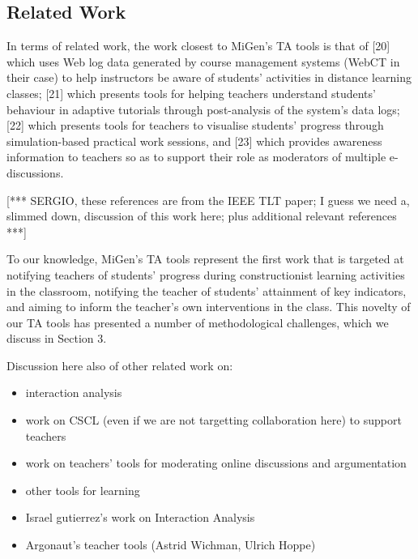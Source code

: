 
\subsection{Related Work}
\label{sec:related}

In terms of related work, the work closest to MiGen's TA tools is that
of [20] which uses Web log data generated by course management systems
(WebCT in their case) to help instructors be aware of students’
activities in distance learning classes; [21] which presents tools for
helping teachers understand students' behaviour in adaptive tutorials
through post-analysis of the system's data logs; [22] which presents
tools for teachers to visualise students' progress through
simulation-based practical work sessions, and [23] which provides
awareness information to teachers so as to support their role as
moderators of multiple e-discussions.  

[*** SERGIO, these references are from the IEEE TLT paper; I guess we
need a, slimmed down, discussion of this work here; plus additional
relevant references ***] 
 
To our knowledge, MiGen's TA tools represent the first work that is
targeted at notifying teachers of students’ progress during
constructionist learning activities in the classroom, notifying the
teacher of students’ attainment of key indicators, and aiming to
inform the teacher’s own interventions in the class. This novelty of
our TA tools has presented a number of methodological challenges,
which we discuss in Section 3.  

Discussion here also of other related work on: 
\begin{itemize}
\item  interaction analysis
\item  work on CSCL (even if we are not targetting collaboration here)
  to support teachers 
\item  work on teachers’ tools for moderating online discussions and
  argumentation 
\item  other tools for learning
\item Israel gutierrez's work on Interaction Analysis
\item Argonaut's teacher tools (Astrid Wichman, Ulrich Hoppe)
\end{itemize}


